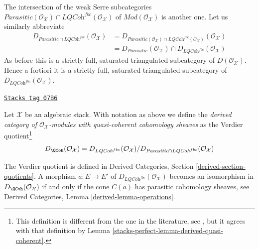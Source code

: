 \medskip\noindent
The intersection of the weak Serre subcategories
$\textit{Parasitic}(\mathcal{O}_\mathcal{X}) \cap
\textit{LQCoh}^{fbc}(\mathcal{O}_\mathcal{X})$
of $\textit{Mod}(\mathcal{O}_\mathcal{X})$
is another one.
Let us similarly abbreviate
\begin{align*}
D_{\textit{Parasitic} \cap \textit{LQCoh}^{fbc}}(\mathcal{O}_\mathcal{X})
& =
D_{\textit{Parasitic}(\mathcal{O}_\mathcal{X}) \cap
\textit{LQCoh}^{fbc}(\mathcal{O}_\mathcal{X})}(\mathcal{O}_\mathcal{X}) \\
& =
D_{\textit{Parasitic}}(\mathcal{O}_\mathcal{X})
\cap
D_{\textit{LQCoh}^{fbc}}(\mathcal{O}_\mathcal{X})
\end{align*}
As before this is a strictly full, saturated triangulated subcategory of
$D(\mathcal{O}_\mathcal{X})$. Hence a fortiori it is a
strictly full, saturated triangulated subcategory of
$D_{\textit{LQCoh}^{fbc}}(\mathcal{O}_\mathcal{X})$.

\begin{definition}[Derived]
\label{stacks-perfect-definition-derived}
\href{https://stacks.math.columbia.edu/tag/07B6}{\texttt{Stacks tag 07B6}}

Let $\mathcal{X}$ be an algebraic stack. With notation as above
we define the {\it derived category of $\mathcal{O}_\mathcal{X}$-modules with
quasi-coherent cohomology sheaves} as the Verdier quotient\footnote{This
definition is different from the one in the literature, see
\cite[6.3]{olsson_sheaves}, but it agrees with that definition
by Lemma \ref{stacks-perfect-lemma-derived-quasi-coherent}.}
$$
D_\QCoh(\mathcal{O}_\mathcal{X}) =
D_{\textit{LQCoh}^{fbc}}(\mathcal{O}_\mathcal{X})/
D_{\textit{Parasitic} \cap \textit{LQCoh}^{fbc}}(\mathcal{O}_\mathcal{X})
$$
\end{definition}

The Verdier quotient is defined in Derived Categories, Section
\ref{derived-section-quotients}. A morphism
$a : E \to E'$ of $D_{\textit{LQCoh}^{fbc}}(\mathcal{O}_\mathcal{X})$
becomes an isomorphism in $D_\QCoh(\mathcal{O}_\mathcal{X})$ if and
only if the cone $C(a)$ has parasitic cohomology sheaves, see
Derived Categories, Lemma \ref{derived-lemma-operations}.

